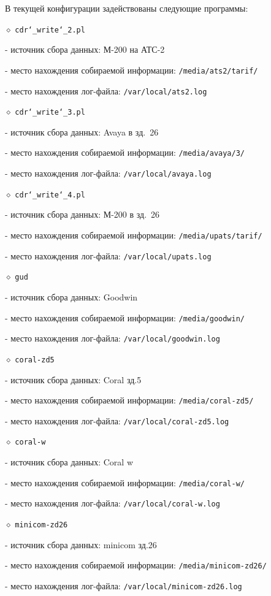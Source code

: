 \noindent
В текущей конфигурации задействованы следующие программы:
\medskip

\noindent $\diamond$ {\tt cdr\char`_write\char`_2.pl}
\item{} - источник сбора данных: М-200 на АТС-2
\item{} - место нахождения собираемой информации: {\tt /media/ats2/tarif/}
\item{} - место нахождения лог-файла: {\tt /var/local/ats2.log}
\smallskip

\noindent $\diamond$ {\tt cdr\char`_write\char`_3.pl}
\item{} - источник сбора данных: Avaya в зд.~26
\item{} - место нахождения собираемой информации: {\tt /media/avaya/3/}
\item{} - место нахождения лог-файла: {\tt /var/local/avaya.log}
\smallskip

\noindent $\diamond$ {\tt cdr\char`_write\char`_4.pl}
\item{} - источник сбора данных: М-200 в зд.~26
\item{} - место нахождения собираемой информации: {\tt /media/upats/tarif/}
\item{} - место нахождения лог-файла: {\tt /var/local/upats.log}
\smallskip

\noindent $\diamond$ {\tt gud}
\item{} - источник сбора данных: Goodwin
\item{} - место нахождения собираемой информации: {\tt /media/goodwin/}
\item{} - место нахождения лог-файла: {\tt /var/local/goodwin.log}
\smallskip

\noindent $\diamond$ {\tt coral-zd5}
\item{} - источник сбора данных: Coral зд.5
\item{} - место нахождения собираемой информации: {\tt /media/coral-zd5/}
\item{} - место нахождения лог-файла: {\tt /var/local/coral-zd5.log}
\bigskip

\noindent $\diamond$ {\tt coral-w}
\item{} - источник сбора данных: Coral w
\item{} - место нахождения собираемой информации: {\tt /media/coral-w/}
\item{} - место нахождения лог-файла: {\tt /var/local/coral-w.log}
\bigskip

\noindent $\diamond$ {\tt minicom-zd26}
\item{} - источник сбора данных: minicom зд.26
\item{} - место нахождения собираемой информации: {\tt /media/minicom-zd26/}
\item{} - место нахождения лог-файла: {\tt /var/local/minicom-zd26.log}
\bigskip

